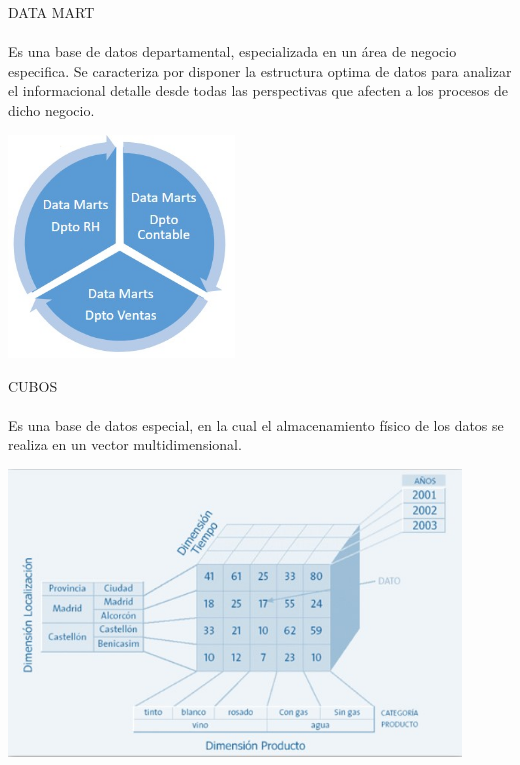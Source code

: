 \documentclass[preprint,12pt]{elsarticle}
\begin{document}
DATA MART\\
\\Es una base de datos departamental, especializada en un área de negocio especifica. Se caracteriza por disponer la estructura optima de datos para analizar el informacional detalle desde todas las perspectivas que afecten a los procesos de dicho negocio.

\begin{center}
	\includegraphics[width=6cm]{./Imagenes/imagen3} 
\end{center}

CUBOS\\
\\Es una base de datos especial, en la cual el almacenamiento físico de los datos se realiza en un vector multidimensional.
\begin{center}
	\includegraphics[width=12cm]{./Imagenes/imagen4} 
\end{center}
\end{document}
